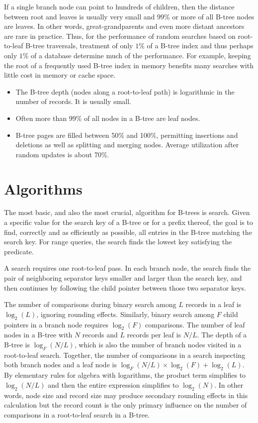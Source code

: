 If a single branch node can point to hundreds of children, then the
distance between root and leaves is usually very small and $99\%$ or more
of all B-tree nodes are leaves. In other words, great-grandparents and
even more distant ancestors are rare in practice. Thus, for the
performance of random searches based on root-to-leaf B-tree traversals,
treatment of only $1\%$ of a B-tree index and thus perhaps only $1\%$ of a
database determine much of the performance. For example, keeping the
root of a frequently used B-tree index in memory benefits many searches
with little cost in memory or cache space.

\begin{itemize}
\item
  The B-tree depth (nodes along a root-to-leaf path) is logarithmic in
  the number of records. It is usually small.
\item
  Often more than 99\% of all nodes in a B-tree are leaf nodes.
\item
  B-tree pages are filled between 50\% and 100\%, permitting insertions
  and deletions as well as splitting and merging nodes. Average
  utilization after random updates is about 70\%.
\end{itemize}

\hypertarget{algorithms}{%
\section{Algorithms}\label{algorithms}}

The most basic, and also the most crucial, algorithm for B-trees is
search. Given a specific value for the search key of a B-tree or for a
prefix thereof, the goal is to find, correctly and as efficiently as
possible, all entries in the B-tree matching the search key. For range
queries, the search finds the lowest key satisfying the predicate.

A search requires one root-to-leaf pass. In each branch node, the search
finds the pair of neighboring separator keys smaller and larger than the
search key, and then continues by following the child pointer between
those two separator keys.

The number of comparisons during binary search among $L$ records in
a leaf is $\log_2(L)$, ignoring rounding effects.
Similarly, binary search among $F$ child pointers in a branch node
requires $\log_2(F)$ comparisons. The number of leaf
nodes in a B-tree with $N$ records and $L$ records per leaf is
$N/L$. The depth of a B-tree is
$\log_F(N/L)$, which is also the number of
branch nodes visited in a root-to-leaf search. Together, the number of
comparisons in a search inspecting both branch nodes and a leaf node is
$\log_F(N/L) \times \log_2(F)
+ \log_2(L)$. By elementary rules for algebra with
logarithms, the product term simplifies to
$\log_2(N/L)$ and then the entire expression
simplifies to $\log_2(N)$. In other words, node size
and record size may produce secondary rounding effects in this
calculation but the record count is the only primary influence on the
number of comparisons in a root-to-leaf search in a B-tree.

